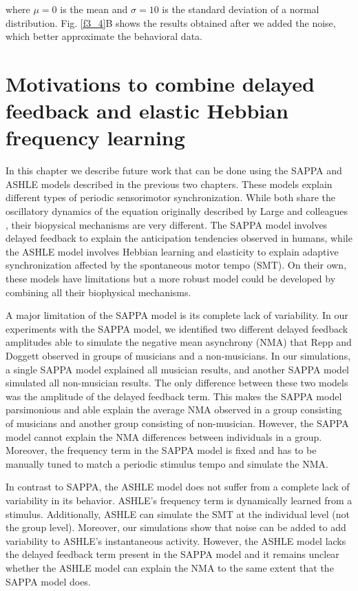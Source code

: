 \documentclass{report}
\begin{document}
where $\mu=0$ is the mean and $\sigma=10$ is the standard deviation of a normal distribution. Fig.{} \ref{f3_4}B shows the results obtained after we added the noise, which better approximate the behavioral data.

\chapter{Motivations to combine delayed feedback and elastic Hebbian frequency learning}

In this chapter we describe future work that can be done using the SAPPA and ASHLE models described in the previous two chapters. These models explain different types of periodic sensorimotor synchronization. While both share the oscillatory dynamics of the equation originally described by Large and colleagues \cite{large2010canonical}, their biopysical mechanisms are very different. The SAPPA model involves delayed feedback to explain the anticipation tendencies observed in humans, while the ASHLE model involves Hebbian learning and elasticity to explain adaptive synchronization affected by the spontaneous motor tempo (SMT). On their own, these models have limitations but a more robust model could be developed by combining all their biophysical mechanisms.

A major limitation of the SAPPA model is its complete lack of variability. In our experiments with the SAPPA model, we identified two different delayed feedback amplitudes able to simulate the negative mean asynchrony (NMA) that Repp and Doggett \cite{repp2007tapping} observed in groups of musicians and a non-musicians. In our simulations, a single SAPPA model explained all musician results, and another SAPPA model simulated all non-musician results. The only difference between these two models was the amplitude of the delayed feedback term. This makes the SAPPA model parsimonious and able explain the average NMA observed in a group consisting of musicians and another group consisting of non-musician. However, the SAPPA model cannot explain the NMA differences between individuals in a group. Moreover, the frequency term in the SAPPA model is fixed and has to be manually tuned to match a periodic stimulus tempo and simulate the NMA. 

In contrast to SAPPA, the ASHLE model does not suffer from a complete lack of variability in its behavior. ASHLE's frequency term is dynamically learned from a stimulus. Additionally, ASHLE can simulate the SMT at the individual level (not the group level). Moreover, our simulations show that noise can be added to add variability to ASHLE's instantaneous activity. However, the ASHLE model lacks the delayed feedback term present in the SAPPA model and it remains unclear whether the ASHLE model can explain the NMA to the same extent that the SAPPA model does. 
\end{document}
